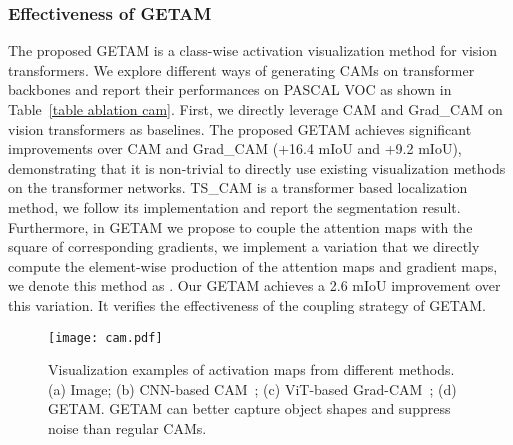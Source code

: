 \documentclass[10pt,twocolumn,letterpaper]{article}
\begin{document}
\subsubsection{Effectiveness of GETAM}
The proposed GETAM is a class-wise activation visualization method for vision transformers.
We explore different ways of generating CAMs on transformer backbones and report their performances on PASCAL VOC
as shown in Table~\ref{table ablation cam}.
First, we directly leverage CAM \cite {zhou2016learning} and Grad\_CAM \cite{selvaraju2016grad} on vision transformers as baselines.
The proposed GETAM achieves significant improvements over CAM and Grad\_CAM (+16.4 mIoU and +9.2 mIoU), demonstrating that it is non-trivial to directly use existing visualization methods on the transformer networks.
TS\_CAM \cite{gao2021tscam} is a transformer based localization method, we follow its implementation and report the segmentation result.
Furthermore, in GETAM we propose to couple the attention maps with the square of corresponding gradients, 
we implement a variation that we directly compute the element-wise production of the attention maps and gradient maps, we denote this method as  
.
Our GETAM achieves a 2.6 mIoU improvement over this variation. It verifies the effectiveness of the coupling strategy of GETAM.



\begin{figure}[htb]
\begin{center}
   {\texttt{[image: cam.pdf]}} 
   \end{center}
\caption{Visualization examples of activation maps from different methods. (a) Image; (b) CNN-based CAM~\cite{zhou2016learning}; (c) ViT-based Grad-CAM~\cite{selvaraju2016grad};  (d) GETAM. GETAM can
better capture object shapes and suppress noise than regular CAMs.}
\label{fig:cam}
\end{figure}
\end{document}
